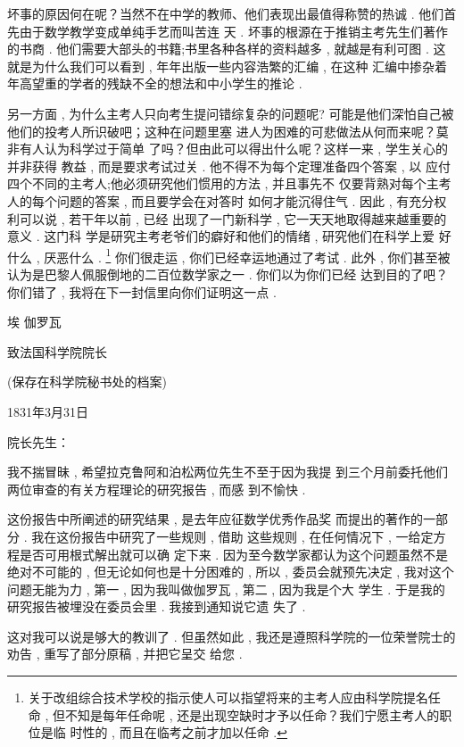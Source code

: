坏事的原因何在呢？当然不在中学的教师、他们表现出最值得称赞的热诚 . 他们首先由于数学教学变成单纯手艺而叫苦连 天 . 坏事的根源在于推销主考先生们著作的书商 . 他们需要大部头的书籍;书里各种各样的资料越多 , 就越是有利可图 . 这就是为什么我们可以看到 , 年年出版一些内容浩繁的汇编 , 在这种 汇编中掺杂着年高望重的学者的残缺不全的想法和中小学生的推论 . 

另一方面 , 为什么主考人只向考生提问错综复杂的问题呢? 可能是他们深怕自己被他们的投考人所识破吧；这种在问题里塞 进人为困难的可悲做法从何而来呢？莫非有人认为科学过于简单 了吗？但由此可以得出什么呢？这样一来 , 学生关心的并非获得 教益 , 而是要求考试过关 . 他不得不为每个定理准备四个答案 , 以 应付四个不同的主考人;他必须研究他们惯用的方法 , 并且事先不 仅要背熟对每个主考人的每个问题的答案 , 而且要学会在对答时 如何才能沉得住气 . 因此 , 有充分权利可以说 , 若干年以前 , 已经 出现了一门新科学 , 它一天天地取得越来越重要的意义 . 这门科 学是研究主考老爷们的癖好和他们的情绪 , 研究他们在科学上爱 好什么 , 厌恶什么 . \footnote{关于改组综合技术学校的指示使人可以指望将来的主考人应由科学院提名任 命 , 但不知是每年任命呢 , 还是出现空缺时才予以任命？我们宁愿主考人的职位是临 时性的 , 而且在临考之前才加以任命 . }
你们很走运 , 你们已经幸运地通过了考试 . 此外 , 你们甚至被认为是巴黎人佩服倒地的二百位数学家之一 . 你们以为你们已经 达到目的了吧？你们错了 , 我将在下一封信里向你们证明这一点 . 

\begin{flushright}
	埃 \textbullet 伽罗瓦
\end{flushright}

\begin{center}
	致法国科学院院长

(保存在科学院秘书处的档案)

1831年3月31日
\end{center}

院长先生：

我不揣冒昧 , 希望拉克鲁阿和泊松两位先生不至于因为我提 到三个月前委托他们两位审查的有关方程理论的研究报告 , 而感 到不愉快 . 

这份报告中所阐述的研究结果 , 是去年应征数学优秀作品奖 而提出的著作的一部分 . 我在这份报告中研究了一些规则 , 借助 这些规则 , 在任何情况下 , 一给定方程是否可用根式解出就可以确 定下来 . 因为至今数学家都认为这个问题虽然不是绝对不可能的 ,  但无论如何也是十分困难的 , 所以 , 委员会就预先决定 , 我对这个 问题无能为力 , 第一 , 因为我叫做伽罗瓦 , 第二 , 因为我是个大 学生 . 于是我的研究报告被埋没在委员会里 . 我接到通知说它遗 失了 . 

这对我可以说是够大的教训了 . 但虽然如此 , 我还是遵照科学院的一位荣誉院士的劝告 , 重写了部分原稿 , 并把它呈交 给您 . 

